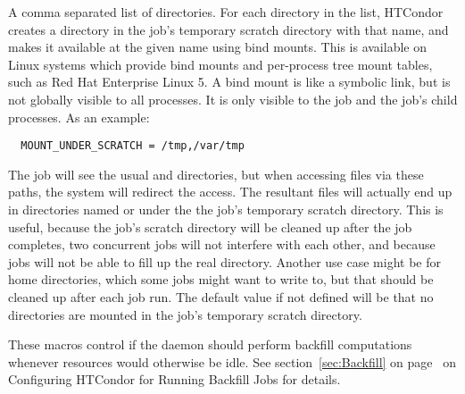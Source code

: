 \begin{description}
\label{param:MountUnderScratch}
\item[\Macro{MOUNT\_UNDER\_SCRATCH}]
  A comma separated list of directories. 
  For each directory in the list, 
  HTCondor creates a directory in the job's temporary scratch directory 
  with that name,
  and makes it available at the given name using bind mounts.
  This is available on Linux systems which provide bind mounts 
  and per-process tree mount tables,
  such as Red Hat Enterprise Linux 5.  
  A bind mount is like a symbolic link,
  but is not globally visible to all processes.
  It is only visible to the job and the job's child processes.
  As an example:
\begin{verbatim}
  MOUNT_UNDER_SCRATCH = /tmp,/var/tmp
\end{verbatim}
  The job will see the usual  and 
  directories, but when accessing files via these paths, the
  system will redirect the access. 
  The resultant files will actually end up in directories named 
   or 
  under the the job's temporary scratch directory. 
  This is useful, because the job's scratch directory will be cleaned up 
  after the job completes, 
  two concurrent jobs will not interfere with each other,
  and because jobs will not be able to fill up the real  directory. 
  Another use case might be for home directories, which some jobs might want
  to write to, but that should be cleaned up after each job run.
  The default value if not defined will be that no directories are mounted in
  the job's temporary scratch directory.

\end{description}

These macros control if the  daemon should perform
backfill computations whenever resources would otherwise be idle.  
See section~\ref{sec:Backfill} on page~\pageref{sec:Backfill} on
Configuring HTCondor for Running Backfill Jobs for details.

